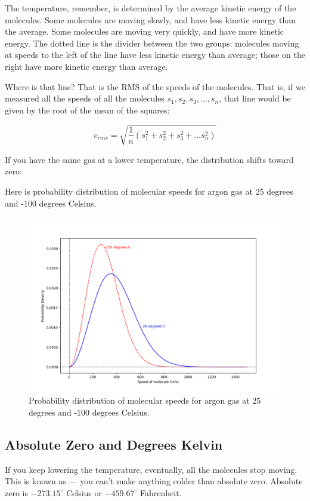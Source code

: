 The temperature, remember, is determined by the average kinetic energy of the molecules. Some molecules are moving slowly, and have less kinetic energy than the average. Some molecules are moving very quickly, and have more kinetic energy. The dotted line is the divider between the two groups: molecules moving at speeds to the left of the line have less kinetic energy than average; those on the right have more kinetic energy than average.

Where is that line? That is the RMS of the speeds of the molecules. That is, if we measured all the speeds of all the molecules $s_1, s_2, s_3, \ldots, s_n$, that line would be given by the root of the mean of the squares:

$$v_{rms} = \sqrt{\frac{1}{n} \left( s_1^2 + s_2^2 + s_3^2 + \ldots s_n^2 \right)}$$

If you have the same gas at a lower temperature, the distribution shifts toward zero:

Here is probability distribution of molecular speeds for argon gas at 25 degrees and -100 degrees Celsius.
\begin{figure}[htbp]
    \centering
    \includegraphics[width=\textwidth]{ar2_plot.png}
    \caption{Probability distribution of molecular speeds for argon gas at 25 degrees and -100 degrees Celsius.}
    \label{fig:argon_speed_distribution_2}
\end{figure}

\subsection{Absolute Zero and Degrees Kelvin}
If you keep lowering the temperature, eventually, all the molecules stop moving. This is known as  --- you
 can't make anything colder than absolute zero. Absolute zero is $-273.15^\circ$ Celsius or $-459.67^\circ$ Fahrenheit.

